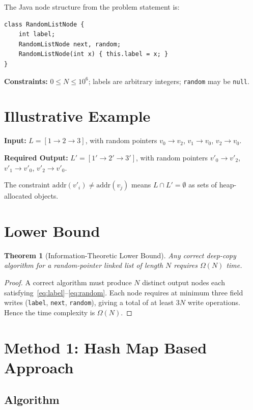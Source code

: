 \documentclass[10pt,journal,compsoc]{IEEEtran}
\newtheorem{theorem}{Theorem}
\begin{document}
The Java node structure from the problem statement is:

\begin{verbatim}
class RandomListNode {
    int label;
    RandomListNode next, random;
    RandomListNode(int x) { this.label = x; }
}
\end{verbatim}

\textbf{Constraints:} $0 \leq N \leq 10^6$; labels are arbitrary integers; \texttt{random} may be \texttt{null}.

\section{Illustrative Example}

\textbf{Input:} $L = [1 \to 2 \to 3]$, with random pointers $v_0 \to v_2$, $v_1 \to v_0$, $v_2 \to v_0$.

\textbf{Required Output:} $L' = [1' \to 2' \to 3']$, with random pointers $v'_0 \to v'_2$, $v'_1 \to v'_0$, $v'_2 \to v'_0$.

The constraint $\mathrm{addr}(v'_i) \neq \mathrm{addr}(v_j)$ means $L \cap L' = \emptyset$ as sets of heap-allocated objects.

\section{Lower Bound}
\label{sec:lower}

\begin{theorem}[Information-Theoretic Lower Bound]
\label{thm:lower}
Any correct deep-copy algorithm for a random-pointer linked list of length $N$ requires $\Omega(N)$ time.
\end{theorem}

\begin{proof}
A correct algorithm must produce $N$ distinct output nodes each satisfying~\eqref{eq:label}--\eqref{eq:random}. Each node requires at minimum three field writes (\texttt{label}, \texttt{next}, \texttt{random}), giving a total of at least $3N$ write operations. Hence the time complexity is $\Omega(N)$.
\end{proof}

\section{Method 1: Hash Map Based Approach}
\label{sec:method1}

\subsection{Algorithm}
\end{document}
